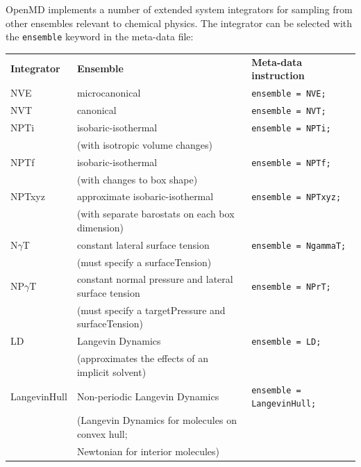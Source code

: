 \documentclass[]{book}
\begin{document}
{\sc OpenMD} implements a number of extended system integrators for
sampling from other ensembles relevant to chemical physics.  The
integrator can be selected with the {\tt ensemble} keyword in the
meta-data file:

\begin{center}
\begin{tabular}{lll}
{\bf Integrator} & {\bf Ensemble} & {\bf Meta-data instruction} \\
NVE & microcanonical & {\tt ensemble = NVE; } \\
NVT & canonical & {\tt ensemble = NVT; } \\
NPTi & isobaric-isothermal & {\tt ensemble = NPTi;} \\
  &  (with isotropic volume changes) & \\
NPTf & isobaric-isothermal & {\tt ensemble = NPTf;} \\
  & (with changes to box shape) & \\
NPTxyz & approximate isobaric-isothermal & {\tt ensemble = NPTxyz;} \\
 &  (with separate barostats on each box dimension) & \\
N$\gamma$T & constant lateral surface tension & {\tt ensemble = NgammaT;} \\
 &  (must specify a surfaceTension) & \\
NP$\gamma$T & constant normal pressure and lateral surface tension & {\tt ensemble = NPrT;} \\
 &  (must specify a targetPressure and surfaceTension) & \\
LD & Langevin Dynamics & {\tt ensemble = LD;} \\
 &  (approximates the effects of an implicit solvent) & \\
 LangevinHull & Non-periodic Langevin Dynamics  & {\tt ensemble = LangevinHull;} \\
 & (Langevin Dynamics for molecules on convex hull;\\
 & Newtonian for interior molecules) & \\
\end{tabular}
\end{center}
\end{document}
